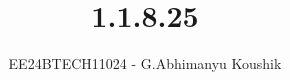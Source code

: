 \documentclass[journal]{IEEEtran}
\begin{document}

\vspace{3cm}

\title{1.1.8.25}
\author{EE24BTECH11024 - G.Abhimanyu Koushik}
{\let\newpage\relax\maketitle}

\renewcommand{\thefigure}{\theenumi}
\renewcommand{\thetable}{\theenumi}
\setlength{\intextsep}{10pt} %


\renewcommand{\thetable}{\theenumi}
\end{document}
